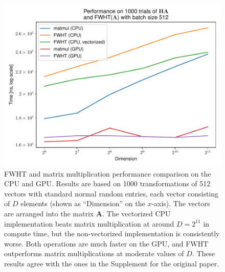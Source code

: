 \begin{figure}
    \centering
    \includegraphics[width=\hsize]{img/compute-performance-all}
    \caption{
        FWHT and matrix multiplication performance comparison on the CPU and GPU.
        Results are based on 1000 transformations of 512 vectors with standard normal random entries, each vector consisting of $D$ elements (shown as ``Dimension'' on the $x$-axis).
        The vectors are arranged into the matrix $\mathbf{A}$.
        The vectorized CPU implementation beats matrix multiplication at around $D = 2^{11}$ in compute time, but the non-vectorized implementation is consistently worse.
        Both operations are much faster on the GPU, and FWHT outperforms matrix multiplications at moderate values of $D$.
        These results agree with the ones in the Supplement for the original paper.
    }
    \label{fig:compute-performance}
\end{figure}